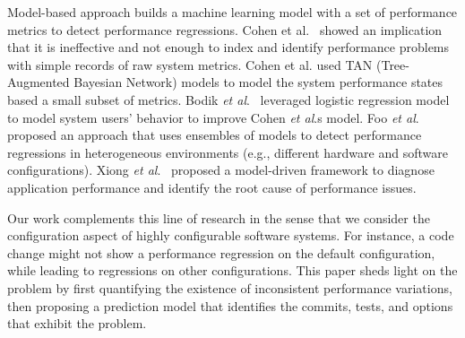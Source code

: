 Model-based approach builds %
a machine learning model with a set of performance metrics to detect performance regressions.  
Cohen et al.~\cite{Cohen:2005:CIC} showed an implication that it is ineffective and not enough to index and identify performance problems with simple records of raw system metrics. Cohen et al. used TAN (Tree-Augmented Bayesian Network) models to model the system performance states based a small subset of metrics. %
Bodik \emph{et al$.$}~\cite{bodik2008hilighter} leveraged logistic regression model to model system users' behavior to improve Cohen \emph{et al$.$}\textquotesingle s model. %
Foo \emph{et al$.$}~\cite{DBLP:conf/icse/FooJAHZF15}  proposed an approach that uses ensembles of models to detect performance regressions in heterogeneous environments (e.g., different hardware and software configurations). %
Xiong \emph{et al$.$}~\cite{Xiong:2013:VAM} proposed a model-driven framework to diagnose application performance and identify the root cause of performance issues. %


Our work complements this line of research in the sense that we consider the configuration aspect of highly configurable software systems. For instance, a code change might not show a performance regression on the default configuration, while leading to regressions on other configurations. This paper sheds light on the \inconsistent problem by first quantifying the existence of inconsistent performance variations, then proposing a prediction model that identifies the commits, tests, and options that exhibit the \inconsistent problem. 
